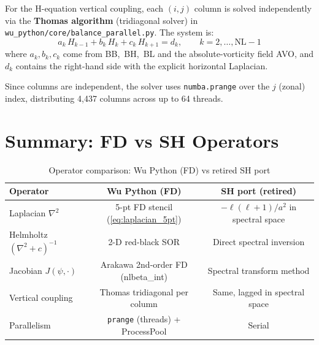 For the H-equation vertical coupling, each $(i,j)$ column is solved independently
via the \textbf{Thomas algorithm} (tridiagonal solver) in
\texttt{wu\_python/core/balance\_parallel.py}.  The system is:
\begin{equation}
  a_k\,H_{k-1} + b_k\,H_k + c_k\,H_{k+1} = d_k,
  \qquad k = 2,\ldots,\text{NL}-1
  \label{eq:tridiag}
\end{equation}
where $a_k,b_k,c_k$ come from BB,~BH,~BL and the absolute-vorticity field AVO,
and $d_k$ contains the right-hand side with the explicit horizontal Laplacian.

Since columns are independent, the solver uses \texttt{numba.prange} over the $j$
(zonal) index, distributing 4,437 columns across up to 64 threads.

\section{Summary: FD vs SH Operators}

\begin{table}[H]
  \centering
  \caption{Operator comparison: Wu Python (FD) vs retired SH port}
  \begin{tabular}{lcc}
    \toprule
    Operator & Wu Python (FD) & SH port (retired) \\
    \midrule
    Laplacian $\nabla^2$    & 5-pt FD stencil (\ref{eq:laplacian_5pt}) & $-\ell(\ell+1)/a^2$ in spectral space \\
    Helmholtz $(\nabla^2+c)^{-1}$ & 2-D red-black SOR & Direct spectral inversion \\
    Jacobian $J(\psi,\cdot)$     & Arakawa 2nd-order FD (nlbeta\_int) & Spectral transform method \\
    Vertical coupling       & Thomas tridiagonal per column & Same, lagged in spectral space \\
    Parallelism             & \texttt{prange} (threads) + ProcessPool & Serial \\
    \bottomrule
  \end{tabular}
\end{table}

